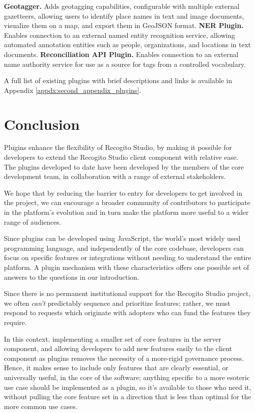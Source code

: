 \documentclass[final]{anthology-ch}         %
\begin{document}
\textbf{Geotagger.} Adds geotagging capabilities, configurable with multiple external gazetteers, allowing users to identify place names in text and image documents, visualize them on a map, and export them in GeoJSON format.
\textbf{NER Plugin.} Enables connection to an external named entity recognition service, allowing automated annotation entities such as people, organizations, and locations in text documents.
\textbf{Reconciliation API Plugin.} Enables connection to an external name authority service for use as a source for tags from a controlled vocabulary.

\noindent
\newline
A full list of existing plugins with brief descriptions and links is available in Appendix \ref{appdx:second_appendix_plugins}.

\section{Conclusion}

Plugins enhance the flexibility of Recogito Studio, by making it possible for developers to extend the Recogito Studio client component with relative ease. The plugins developed to date have been developed by the members of the core development team, in collaboration with a range of external stakeholders. 

We hope that by reducing the barrier to entry for developers to get involved in the project, we can encourage a broader community of contributors to participate in the platform's evolution and in turn make the platform more useful to a wider range of audiences.

Since plugins can be developed using JavaScript, the world's most widely used programming language, and independently of the core codebase, developers can focus on specific features or integrations without needing to understand the entire platform.  A plugin mechanism with these characteristics offers one possible set of answers to the questions in our introduction.
  
  Since there is no permanent institutional support for the Recogito Studio project, we often \textit{can't} predictably sequence and prioritize features; rather, we must respond to requests which originate with adopters who can fund the features they require. 
  
  In this context,  implementing a smaller set of core features in the server component, and allowing developers to add new features easily to the client component as plugins removes the necessity of a more-rigid governance process. Hence, it makes sense to include only features that are clearly essential, or universally useful, in the core of the software; anything specific to a more esoteric use case should be implemented as a plugin, so it's available to those who need it, without pulling the core feature set in a direction that is less than optimal for the more common use cases.
\end{document}

